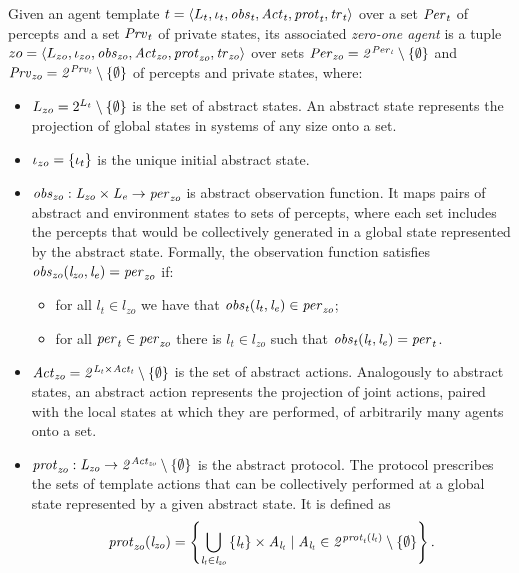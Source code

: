 \begin{definition}
Given an agent template ${t} = \left \langle L_{t}, \iota_{t}, \it{obs}_{t},  \it{Act}_{t},
\it{prot}_{t}, \it{tr}_{t}  \right \rangle$ over a set $\it{Per}_{t}$ of percepts and a set $\it{Prv}_{t}$ of
private states, its associated \emph{zero-one agent} is a tuple ${zo} =
\left \langle L_{zo}, \iota_{zo}, \it{obs}_{zo}, \it{Act}_{zo}, \it{prot}_{zo}, \it{tr}_{zo} \right \rangle$ over
sets $\it{Per}_{zo} = 2^{\it{Per}_{t}} \setminus \left \{ \emptyset \right \}$ and $\it{Prv}_{zo}=
2^{\it{Prv}_{t}} \setminus \left \{ \emptyset \right \}$ of percepts and private states, where:
\begin{itemize} 
    \item $L_{zo} = 2^{L_{t}} \setminus \left \{ \emptyset \right \}$ is the set
    of abstract states. An abstract state represents the projection of global
    states in systems of any size onto a set.

    \item $\iota_{zo} = \left \{ \iota_{t} \right \}$ is the unique initial abstract state.
    
    \item $\it{obs}_{zo} : L_{zo} \times L_{e} \rightarrow \it{per}_{zo}$ is
    abstract observation function. It maps pairs of abstract and environment
    states to sets of percepts, where each set includes the percepts that would
    be collectively generated in a global state represented by the abstract
    state. Formally, the observation function satisfies $\it{obs}_{zo}(l_{zo}, l_e) =
    \it{per}_{zo}$ if:
    \begin{itemize}
        \item for all $l_t \in l_{zo}$ we have that $\it{obs}_{t}(l_t, l_e) \in
        \it{per}_{zo}$;
        \item for all $\it{per}_{t} \in \it{per}_{zo}$ there is $l_t \in
        l_{zo}$ such that $\it{obs}_{t}(l_t, l_e) = \it{per}_{t}$.
    \end{itemize}

    \item $\it{Act}_{zo} = 2^{L_{t} \times \it{Act}_{t}} \setminus \left \{ \emptyset \right \}$
    is the set of abstract actions. Analogously to abstract states, an abstract
    action represents the projection of joint actions, paired with the local
    states at which they are performed,  of arbitrarily many agents onto a set.

    \item $\it{prot}_{zo} : L_{zo} \rightarrow 2^{\it{Act}_{zo}} \setminus
    \left \{ \emptyset \right \}$ is the abstract protocol. The protocol prescribes the sets
    of template actions that can be collectively performed at a global state
    represented by a given abstract state. It is defined as $$\it{prot}_{zo}(l_{zo})
    = \left \{  \bigcup_{l_t \in l_{zo}} \left \{ l_t \right \} \times A_{l_t} \mid A_{l_t} \in
    2^{\it{prot}_{t}(l_t)} \setminus \left \{ \emptyset \right \} \right \}.$$


\end{itemize}
\end{definition}
